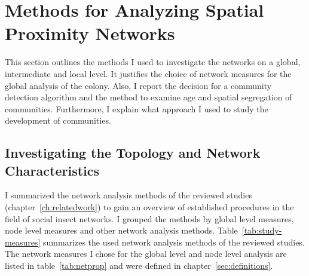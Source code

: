 \section{Methods for Analyzing Spatial Proximity Networks}
This section outlines the methods I used to investigate the networks on a global, intermediate and local level.
It justifies the choice of network measures for the global analysis of the colony.
Also, I report the decision for a community detection algorithm and the method to examine age and spatial segregation of communities.
Furthermore, I explain what approach I used to study the development of communities.

\subsection{Investigating the Topology and Network Characteristics}
\label{subsec:APmeasures}
I summarized the network analysis methods of the reviewed studies (chapter~\ref{ch:relatedwork}) to gain an overview of established procedures in the field of social insect networks. I grouped the methods by global level measures, node level measures and other network analysis methods.
Table~\ref{tab:study-measures} summarizes the used network analysis methods of the reviewed studies.
The network measures I chose for the global level and node level analysis are listed in table~\ref{tab:netprop} and were defined in chapter~\ref{sec:definitions}.

